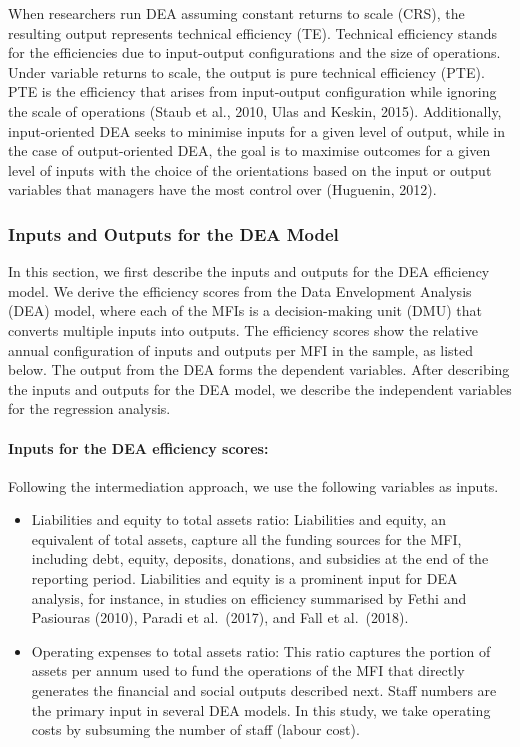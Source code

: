 \documentclass[
]{article}
\begin{document}
When researchers run DEA assuming constant returns to scale (CRS), the
resulting output represents technical efficiency (TE). Technical
efficiency stands for the efficiencies due to input-output
configurations and the size of operations. Under variable returns to
scale, the output is pure technical efficiency (PTE). PTE is the
efficiency that arises from input-output configuration while ignoring
the scale of operations (Staub et al., 2010, Ulas and Keskin, 2015).
Additionally, input-oriented DEA seeks to minimise inputs for a given
level of output, while in the case of output-oriented DEA, the goal is
to maximise outcomes for a given level of inputs with the choice of the
orientations based on the input or output variables that managers have
the most control over (Huguenin, 2012).

\hypertarget{inputs-and-outputs-for-the-dea-model}{%
\subsubsection{Inputs and Outputs for the DEA
Model}\label{inputs-and-outputs-for-the-dea-model}}

In this section, we first describe the inputs and outputs for the DEA
efficiency model. We derive the efficiency scores from the Data
Envelopment Analysis (DEA) model, where each of the MFIs is a
decision-making unit (DMU) that converts multiple inputs into outputs.
The efficiency scores show the relative annual configuration of inputs
and outputs per MFI in the sample, as listed below. The output from the
DEA forms the dependent variables. After describing the inputs and
outputs for the DEA model, we describe the independent variables for the
regression analysis.

\hypertarget{inputs-for-the-dea-efficiency-scores}{%
\paragraph{Inputs for the DEA efficiency
scores:}\label{inputs-for-the-dea-efficiency-scores}}

Following the intermediation approach, we use the following variables as
inputs.

\begin{itemize}
\item
  Liabilities and equity to total assets ratio: Liabilities and equity,
  an equivalent of total assets, capture all the funding sources for the
  MFI, including debt, equity, deposits, donations, and subsidies at the
  end of the reporting period. Liabilities and equity is a prominent
  input for DEA analysis, for instance, in studies on efficiency
  summarised by Fethi and Pasiouras (2010), Paradi et al.~(2017), and
  Fall et al.~(2018).
\item
  Operating expenses to total assets ratio: This ratio captures the
  portion of assets per annum used to fund the operations of the MFI
  that directly generates the financial and social outputs described
  next. Staff numbers are the primary input in several DEA models. In
  this study, we take operating costs by subsuming the number of staff
  (labour cost).
\end{itemize}
\end{document}
